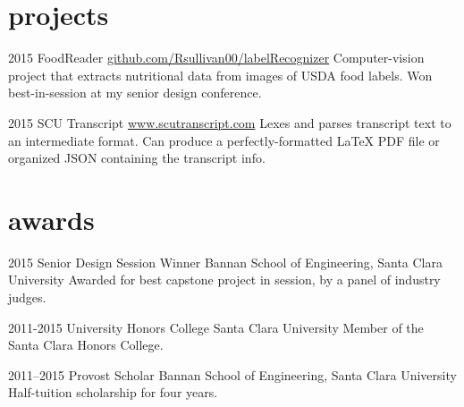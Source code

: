 \documentclass[]{friggeri-cv} %
\begin{document}

\section{projects}

\begin{entrylist}

\entry
{2015}
{FoodReader}
{\href{https://github.com/Rsullivan00/labelRecognizer}{github.com/Rsullivan00/labelRecognizer}}
{Computer-vision project that extracts nutritional data from images of USDA food labels. Won best-in-session at my senior design conference.}

\entry
{2015}
{SCU Transcript}
{\href{http://www.scutranscript.com}{www.scutranscript.com}}
{Lexes and parses transcript text to an intermediate format. Can produce a perfectly-formatted LaTeX PDF file or organized JSON containing the transcript info.}


\end{entrylist}




\section{awards}

\begin{entrylist}

\entry
{2015}
{Senior Design Session Winner}
{Bannan School of Engineering, Santa Clara University}
{Awarded for best capstone project in session, by a panel of industry judges.}

\entry
{2011-2015}
{University Honors College}
{Santa Clara University}
{Member of the Santa Clara Honors College.}

\entry
{2011--2015}
{Provost Scholar}
{Bannan School of Engineering, Santa Clara University}
{Half-tuition scholarship for four years.}


\end{entrylist}
\end{document}
